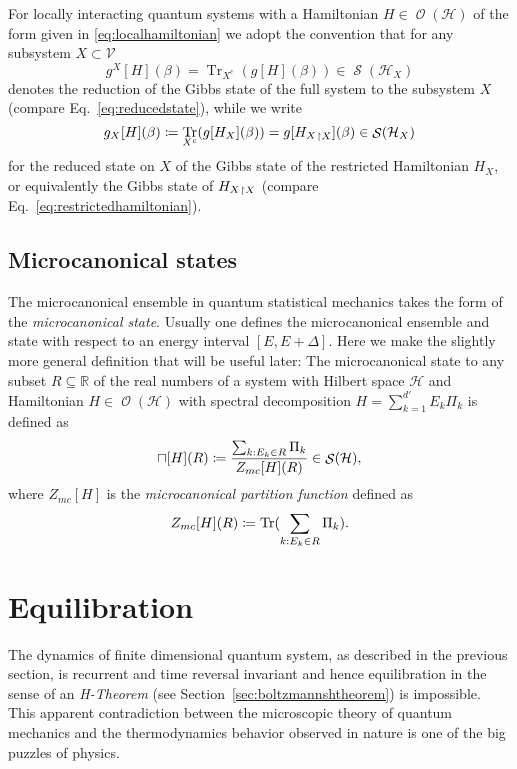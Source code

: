 \documentclass[a4paper,12pt,listof=totoc,index=totoc,bibliography=totoc,headsepline=false,headings=normal,BCOR16.153846mm,DIV12,headinclude,twoside,cleardoublepage=empty,numbers=noenddot,final]{scrreprt}
\theoremstyle{mystyle}
\numberwithin{equation}{section}
\numberwithin{figure}{section}
\numberwithin{lemma}{section}
\numberwithin{theorem}{section}
\numberwithin{corollary}{section}
\numberwithin{definition}{section}
\numberwithin{conjecture}{section}
\numberwithin{observation}{section}
\newcommand{\+}{\mkern2mu}
\newcommand{\coloneqq}{\mathrel{\vcentcolon\mkern-1.2mu=}} %
\newcommand{\texteqref}[1]{Eq.~\eqref{#1}}
\renewcommand{\H}{H}
\newcommand{\rhog}{g}
\newcommand{\rhomc}{{\sqcap}}
\newcommand{\Vset}{\mathcal{V}}
\newcommand{\compl}[1]{{{#1}^c}}
\newcommand{\trunc}[2]{{#1}_{\upharpoonright \mathnormal{#2}}}
\DeclareMathOperator{\1}{\mathds{1}}
\DeclareMathOperator{\Obs}{\mathcal{O}}
\DeclareMathOperator{\Qst}{\mathcal{S}}
\DeclareMathOperator{\Tr}{Tr}
\newcommand{\mc}[1]{\mathcal{#1}}
\newcommand{\mcH}{\mc{H}}
\newcommand{\mb}[1]{\mathbb{#1}}
\newcommand{\R}{\mb{R}}
\begin{document}
For locally interacting quantum systems with a Hamiltonian $\H \in \Obs(\mcH)$ of the form given in \eqref{eq:localhamiltonian} we adopt the convention that for any subsystem $X \subset \Vset$
\begin{equation}
  \rhog^X[\H](\beta) = \Tr_{\compl{X}}(\rhog[\H](\beta)) \in \Qst(\mcH_X)
\end{equation}
denotes the reduction of the Gibbs state of the full system to the subsystem $X$ (compare \texteqref{eq:reducedstate}), while we write
\begin{equation}
  \rhog_X[\H](\beta) \coloneqq \Tr_{\compl{X}}(\rhog[\H_X](\beta)) = \rhog[\trunc{\H_X} X](\beta) \in \Qst(\mcH_X) 
\end{equation}
for the reduced state on $X$ of the Gibbs state of the restricted Hamiltonian $\H_X$, or equivalently the Gibbs state of $\trunc{\H_X} X$  (compare \texteqref{eq:restrictedhamiltonian}).


\subsection{Microcanonical states}
\label{sec:microcanonicalstates}
%
The microcanonical ensemble in quantum statistical mechanics takes the form of the \emph{microcanonical state}.
Usually one defines the microcanonical ensemble and state with respect to an energy interval $[E,E+\Delta]$.
Here we make the slightly more general definition that will be useful later:
The microcanonical state to any subset $R \subseteq \R$ of the real numbers of a system with Hilbert space $\mcH$ and Hamiltonian $\H \in \Obs(\mcH)$ with spectral decomposition $\H = \sum_{k=1}^{d'} E_k \Pi_k$ is defined as
\begin{equation}
  \rhomc[\H](R) \coloneqq \frac{\sum_{k:E_k \in R} \Pi_k}{Z_{mc}[\H](R)} \in \Qst(\mcH) ,
\end{equation}
where $Z_{mc}[\H]$ is the \emph{microcanonical partition function} defined as
\begin{equation}
  Z_{mc}[\H](R) \coloneqq \Tr(\sum_{k:E_k \in R} \Pi_k) .
\end{equation}


\section{Equilibration}
\label{sec:equilibration}
%
The dynamics of finite dimensional quantum system, as described in the previous section, is recurrent \cite{JChemPhys843,Schulman1978,PhysRevLett.49,PhysRev.107.33,Wallace2013} and time reversal invariant and hence equilibration in the sense of an \emph{H-Theorem} \cite{RevModPhys.27.289} (see Section~\ref{sec:boltzmannshtheorem}) is impossible.
This apparent contradiction between the microscopic theory of quantum mechanics and the thermodynamics behavior observed in nature is one of the big puzzles of physics.
\end{document}
